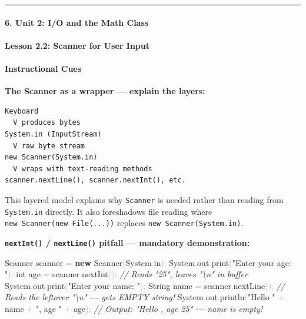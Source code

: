 \documentclass[
  justified,
  openright,
]{tufte-book}
\let\subsection\paragraph
\let\paragraph\paragraph
\newcommand{\KeywordTok}[1]{\textcolor{CodeKeyword}{\textbf{#1}}}  %
\newcommand{\StringTok}[1]{\textcolor{CodeString}{#1}}              %
\newcommand{\CommentTok}[1]{\textcolor{CodeComment}{\textit{#1}}}  %
\newcommand{\CodeFuncTok}[1]{\textcolor{CodeKeyword}{#1}}           %
\newcommand{\CodeTypeTok}[1]{\textcolor{CodeType}{#1}}              %
\newcommand{\OperatorTok}[1]{\textcolor{DarkGray}{#1}}              %
\newenvironment{Shaded}{%
  \begin{mdframed}[style=TufteCode]%
}{%
  \end{mdframed}%
}
\let\subsection\paragraph
\let\paragraph\paragraph
\begin{document}
\begin{center}\rule{0.5\linewidth}{0.5pt}\end{center}

\subsection{6. Unit 2: I/O and the Math
Class}\label{unit-2-io-and-the-math-class}

\subsection{Lesson 2.2: Scanner for User
Input}\label{lesson-2.2-scanner-for-user-input}

\paragraph{Instructional Cues}\label{instructional-cues-24}

\textbf{The Scanner as a wrapper --- explain the layers:}

\begin{verbatim}
Keyboard
  V produces bytes
System.in (InputStream)
  V raw byte stream
new Scanner(System.in)
  V wraps with text-reading methods
scanner.nextLine(), scanner.nextInt(), etc.
\end{verbatim}

This layered model explains why \texttt{Scanner} is needed rather than
reading from \texttt{System.in} directly. It also foreshadows file
reading where \texttt{new\ Scanner(new\ File(...))} replaces
\texttt{new\ Scanner(System.in)}.

\textbf{\texttt{nextInt()} / \texttt{nextLine()} pitfall --- mandatory
demonstration:}

\begin{Shaded}
\begin{Highlighting}[]
Scanner scanner \OperatorTok{=} \KeywordTok{new} Scanner\OperatorTok{(}System\OperatorTok{.}\CodeFuncTok{in}\OperatorTok{);}
System\OperatorTok{.}\CodeFuncTok{out}\OperatorTok{.}\CodeFuncTok{print}\OperatorTok{(}\StringTok{"Enter your age: "}\OperatorTok{);}
\CodeTypeTok{int} age \OperatorTok{=} scanner\OperatorTok{.}\CodeFuncTok{nextInt}\OperatorTok{();}          \CommentTok{// Reads "25", leaves "\textbackslash{}n" in buffer}
System\OperatorTok{.}\CodeFuncTok{out}\OperatorTok{.}\CodeFuncTok{print}\OperatorTok{(}\StringTok{"Enter your name: "}\OperatorTok{);}
String name \OperatorTok{=} scanner\OperatorTok{.}\CodeFuncTok{nextLine}\OperatorTok{();}     \CommentTok{// Reads the leftover "\textbackslash{}n" {-}{-}{-} gets EMPTY string!}
System\OperatorTok{.}\CodeFuncTok{out}\OperatorTok{.}\CodeFuncTok{println}\OperatorTok{(}\StringTok{"Hello "} \OperatorTok{+} name \OperatorTok{+} \StringTok{", age "} \OperatorTok{+} age\OperatorTok{);}
\CommentTok{// Output: "Hello , age 25" {-}{-}{-} name is empty!}
\end{Highlighting}
\end{Shaded}
\end{document}
